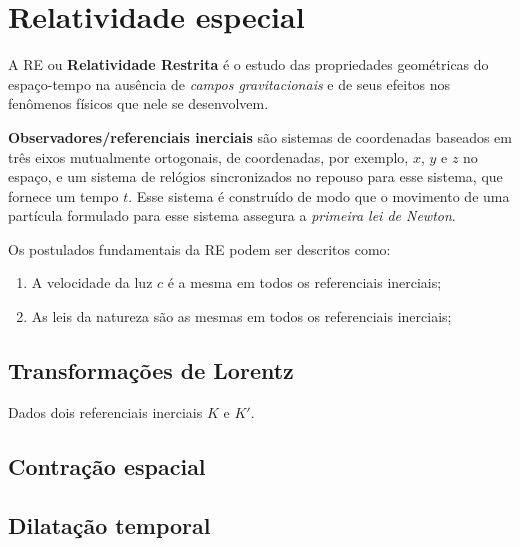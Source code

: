 \documentclass[12pt,a4paper,titlepage,brazil]{article}
\begin{document}

\section{Relatividade especial}

A RE ou {\bf Relatividade Restrita} é o estudo das propriedades geométricas do espaço-tempo na ausência de {\em campos gravitacionais} e de seus efeitos nos fenômenos físicos que nele se desenvolvem.\\

\begin{tcolorbox}
 {\bf Observadores/referenciais inerciais} são sistemas de coordenadas baseados em três eixos mutualmente ortogonais, de coordenadas, por exemplo, $x$, $y$ e $z$ no espaço, e um sistema de relógios sincronizados no repouso para esse sistema, que fornece um tempo $t$. Esse sistema é construído de modo que o movimento de uma partícula formulado para esse sistema assegura a {\em primeira lei de Newton}. 
\end{tcolorbox}

Os postulados fundamentais da RE podem ser descritos como:
\begin{enumerate}
 \item A velocidade da luz $c$ é a mesma em todos os referenciais inerciais;
 \item As leis da natureza são as mesmas em todos os referenciais inerciais;
\end{enumerate}  


\subsection{Transformações de Lorentz}

Dados dois referenciais inerciais $K$ e $K'$.


\subsection{Contração espacial}


\subsection{Dilatação temporal}
\end{document}
